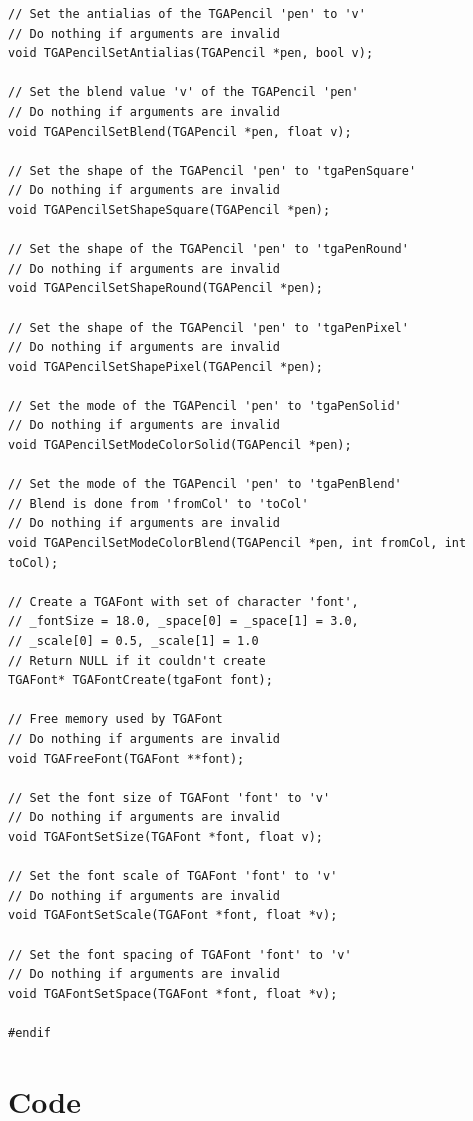 \documentclass[12pt, a4paper]{article}
\begin{document}
\begin{scriptsize}
\begin{ttfamily}
\begin{lstlisting}
// Set the antialias of the TGAPencil 'pen' to 'v'
// Do nothing if arguments are invalid
void TGAPencilSetAntialias(TGAPencil *pen, bool v);

// Set the blend value 'v' of the TGAPencil 'pen'
// Do nothing if arguments are invalid
void TGAPencilSetBlend(TGAPencil *pen, float v);

// Set the shape of the TGAPencil 'pen' to 'tgaPenSquare'
// Do nothing if arguments are invalid
void TGAPencilSetShapeSquare(TGAPencil *pen);

// Set the shape of the TGAPencil 'pen' to 'tgaPenRound'
// Do nothing if arguments are invalid
void TGAPencilSetShapeRound(TGAPencil *pen);

// Set the shape of the TGAPencil 'pen' to 'tgaPenPixel'
// Do nothing if arguments are invalid
void TGAPencilSetShapePixel(TGAPencil *pen);

// Set the mode of the TGAPencil 'pen' to 'tgaPenSolid'
// Do nothing if arguments are invalid
void TGAPencilSetModeColorSolid(TGAPencil *pen);

// Set the mode of the TGAPencil 'pen' to 'tgaPenBlend'
// Blend is done from 'fromCol' to 'toCol'
// Do nothing if arguments are invalid
void TGAPencilSetModeColorBlend(TGAPencil *pen, int fromCol, int toCol);

// Create a TGAFont with set of character 'font', 
// _fontSize = 18.0, _space[0] = _space[1] = 3.0, 
// _scale[0] = 0.5, _scale[1] = 1.0
// Return NULL if it couldn't create
TGAFont* TGAFontCreate(tgaFont font);

// Free memory used by TGAFont
// Do nothing if arguments are invalid
void TGAFreeFont(TGAFont **font);

// Set the font size of TGAFont 'font' to 'v'
// Do nothing if arguments are invalid
void TGAFontSetSize(TGAFont *font, float v);

// Set the font scale of TGAFont 'font' to 'v'
// Do nothing if arguments are invalid
void TGAFontSetScale(TGAFont *font, float *v);

// Set the font spacing of TGAFont 'font' to 'v'
// Do nothing if arguments are invalid
void TGAFontSetSpace(TGAFont *font, float *v);

#endif
\end{lstlisting}
\end{ttfamily}
\end{scriptsize}

\section{Code}
\end{document}

